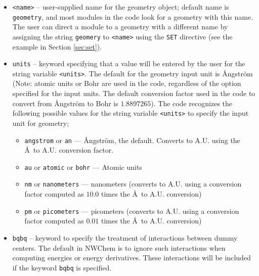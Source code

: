 \begin{itemize}
\item \verb+<name>+ -- user-supplied name for the geometry object; default
name is \verb+geometry+, and
most modules in the code look for a geometry with this name.  The user
can direct a module to a geometry with a different name by assigning
the string \verb+geomery+ to \verb+<name>+ using the \verb+SET+
directive (see the example in Section \ref{sec:set}).

\item \verb+units+ -- keyword specifying that a value will be entered
by the user for the string variable \verb+<units>+.  
The default for the geometry input unit is {\AA}ngstr\"{o}m
(Note: atomic units or Bohr are used in the code, regardless of
the option specified for the input units.  
The default
conversion factor used in the code to convert from {\AA}ngstr\"{o}m to
Bohr is $1.8897265$).
The code recognizes the following possible values for the string variable
\verb+<units>+  to specify the input unit for geometry;
\begin{itemize}
  \item \verb+angstrom+ or \verb+an+ --- {\AA}ngstr\"{o}m, the default.  Converts
   to A.U. using the \AA\ to A.U. conversion factor.
  \item \verb+au+ or \verb+atomic+ or \verb+bohr+ --- Atomic units
  \item \verb+nm+ or \verb+nanometers+ --- nanometers (converts to
     A.U. using a conversion factor computed as $10.0$ times the
     \AA\ to A.U. conversion) 
  \item \verb+pm+ or \verb+picometers+ --- picometers (converts to 
    A.U. using a conversion factor computed as $0.01$ times the 
     \AA\ to A.U. conversion)
\end{itemize}
      
\item \verb+bqbq+ -- keyword to specify the treatment of interactions 
between dummy centers.  The default in NWChem is to ignore such interactions
when computing energies or energy derivatives.  These interactions
will be included if the keyword \verb+bqbq+ is specified.


\end{itemize}
